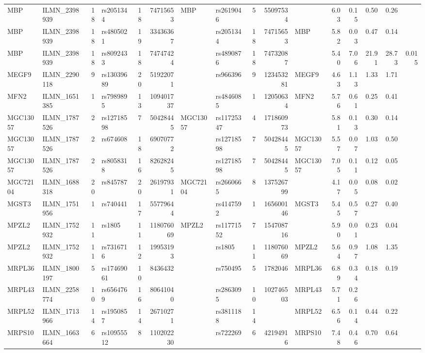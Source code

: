 \documentclass{article}
\begin{document}
\begin{landscape}
{\begin{ThreePartTable}
\begin{longtable}{|llr|lrrl|lrrl|rrrr|r|}
  MBP & ILMN\_2398939 & 18 & rs2051344 & 18 & 74715653 & MBP & rs2619046 & 5 & 55097534 &  & 6.03 & 0.15 & 0.50 & 0.26 &  \\
  MBP & ILMN\_2398939 & 18 & rs4805021 & 19 & 33436367 &  & rs2051344 & 18 & 74715653 & MBP & 5.82 & 0.03 & 0.47 & 0.14 &  \\
  MBP & ILMN\_2398939 & 18 & rs8092433 & 18 & 74747424 &  & rs4890876 & 18 & 74732087 &  & 5.40 & 7.06 & 21.91 & 28.73 & 0.015 \\
  MEGF9 & ILMN\_2290118 & 9 & rs13039689 & 20 & 51922071 &  & rs966396 & 9 & 123453281 & MEGF9 & 4.63 & 1.13 & 1.33 & 1.71 &  \\
  MFN2 & ILMN\_1651385 & 1 & rs7989895 & 13 & 109401737 &  & rs4846085 & 1 & 12050634 & MFN2 & 5.76 & 0.61 & 0.25 & 0.41 &  \\
  MGC13057 & ILMN\_1787526 & 2 & rs12718598 & 7 & 50428445 & MGC13057 & rs11725347 & 4 & 171860973 &  & 5.81 & 0.13 & 0.30 & 0.14 &  \\
  MGC13057 & ILMN\_1787526 & 2 & rs674608 & 18 & 69070772 &  & rs12718598 & 7 & 50428445 & MGC13057 & 5.57 & 0.07 & 1.03 & 0.50 &  \\
  MGC13057 & ILMN\_1787526 & 2 & rs8058318 & 16 & 82628245 &  & rs12718598 & 7 & 50428445 & MGC13057 & 7.05 & 0.11 & 0.12 & 0.05 &  \\
  MGC72104 & ILMN\_1688318 & 20 & rs845787 & 20 & 26197931 & MGC72104 & rs2660665 & 8 & 137526799 &  & 4.17 & 0.05 & 0.08 & 0.02 &  \\
  MGST3 & ILMN\_1751956 & 1 & rs740441 & 17 & 55779644 &  & rs4147592 & 1 & 165600146 & MGST3 & 5.45 & 0.57 & 0.27 & 0.40 &  \\
  MPZL2 & ILMN\_1752932 & 11 & rs1805 & 11 & 118076069 & MPZL2 & rs11771552 & 7 & 154708716 &  & 5.90 & 0.01 & 0.23 & 0.04 &  \\
  MPZL2 & ILMN\_1752932 & 11 & rs7316716 & 12 & 19953193 &  & rs1805 & 11 & 118076069 & MPZL2 & 5.64 & 0.97 & 1.08 & 1.35 &  \\
  MRPL36 & ILMN\_1800197 & 5 & rs17469061 & 10 & 8436432 &  & rs750495 & 5 & 1782046 & MRPL36 & 6.89 & 0.34 & 0.18 & 0.19 &  \\
  MRPL43 & ILMN\_2258774 & 10 & rs6564769 & 16 & 80641040 &  & rs2863095 & 10 & 102746503 & MRPL43 & 5.71 & 0.26 &  &  &  \\
  MRPL52 & ILMN\_1713966 & 14 & rs1950857 & 14 & 26710271 &  & rs3811188 & 14 &  & MRPL52 & 6.56 & 0.14 & 0.44 & 0.22 &  \\
  MRPS10 & ILMN\_1663664 & 6 & rs10955512 & 8 & 110202230 &  & rs722269 & 6 & 42194916 & MRPS10 & 7.48 & 0.46 & 0.70 & 0.64 &  \\

\end{longtable}
\end{ThreePartTable}}
\end{landscape}
\end{document}
